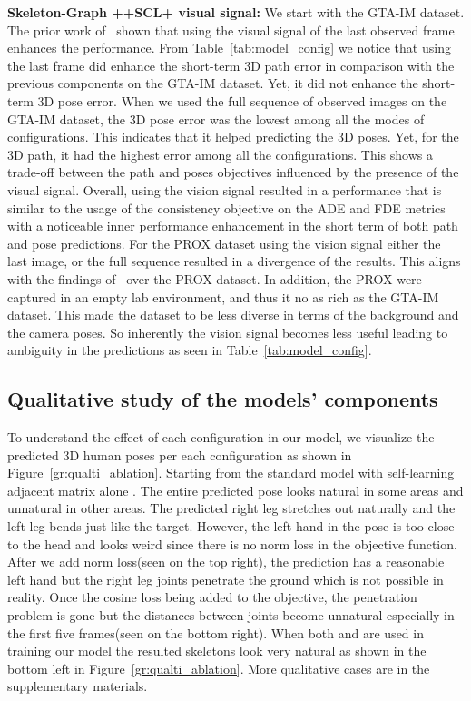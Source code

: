 \documentclass[10pt,twocolumn,letterpaper]{article}
\newcommand*{\ours}{Skeleton-Graph }
\begin{document}
\textbf{\ours ++SCL+ visual signal: }
We start with the GTA-IM dataset. The prior work of~\cite{cao2020long} shown that using the visual signal of the last observed frame enhances the performance. From Table~\ref{tab:model_config} we notice that using the last frame  did enhance the short-term 3D path error in comparison with the previous components on the GTA-IM dataset. Yet, it did not enhance the short-term 3D pose error. When we used the full sequence of observed images  on the GTA-IM dataset, the 3D pose error was the lowest among all the modes of configurations. This indicates that it helped predicting the 3D poses. Yet, for the 3D path, it had the highest error among all the configurations. This shows a trade-off between the path and poses objectives influenced by the presence of the visual signal. Overall, using the vision signal resulted in a performance that is similar to the usage of the consistency objective on the ADE and FDE metrics with a noticeable inner performance enhancement in the short term of both path and pose predictions. For the PROX dataset using the vision signal either the last image,  or the full sequence  resulted in a divergence of the results. This aligns with the findings of~\cite{cao2020long} over the PROX dataset. In addition, the PROX were captured in an empty lab environment, and thus it no as rich as the GTA-IM dataset. This made the dataset to be less diverse in terms of the background and the camera poses. So inherently the vision signal becomes less useful leading to ambiguity in the predictions as seen in Table~\ref{tab:model_config}.

\subsection{Qualitative study of the models' components}
To understand the effect of each configuration in our model, we visualize the predicted 3D human poses per each configuration as shown in Figure~\ref{gr:qualti_ablation}. Starting from the standard model with self-learning adjacent matrix alone . The entire predicted pose looks natural in some areas and unnatural in other areas. The predicted right leg stretches out naturally and the left leg bends just like the target. However, the left hand in the pose is too close to the head and looks weird since there is no norm loss  in the objective function. After we add norm loss(seen on the top right), the prediction has a reasonable left hand but the right leg joints penetrate the ground which is not possible in reality. Once the cosine loss being added  to the objective, the penetration problem is gone but the distances between joints become unnatural especially in the first five frames(seen on the bottom right). When both  and  are used in training our model the resulted skeletons look very natural as shown in the bottom left in Figure~\ref{gr:qualti_ablation}. More qualitative cases are in the supplementary materials. 
\end{document}
